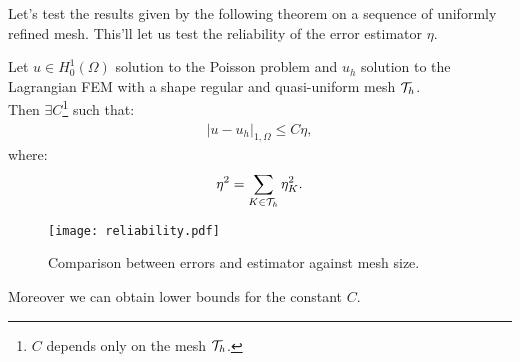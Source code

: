 Let's test the results given by the following theorem on a sequence of uniformly refined mesh. This'll let us test the reliability of the error estimator $\eta$.

\begin{theorem*}[Reliability]
	Let $u \in H_0^1(\Omega)$ solution to the Poisson problem and $u_h$ solution to the Lagrangian FEM with a shape regular and quasi-uniform mesh $\mathcal{T}_h$. \\
	Then $\exists C$\footnote{$C$ depends only on the mesh $\mathcal{T}_h$.} such that:
	\begin{gather}
		\lvert u - u_h \rvert_{1, \Omega} \leq C \eta,
	\end{gather}
	where:
	\begin{gather}
		\eta^2 = \sum_{K \in \mathcal{T}_h} \eta_K^2.
	\end{gather}
\end{theorem*}

\begin{figure}[!ht]
	\centering
	\texttt{[image: reliability.pdf]}
	\caption{Comparison between errors and estimator against mesh size.}
\end{figure}

\newpage
\noindent Moreover we can obtain lower bounds for the constant $C$.

